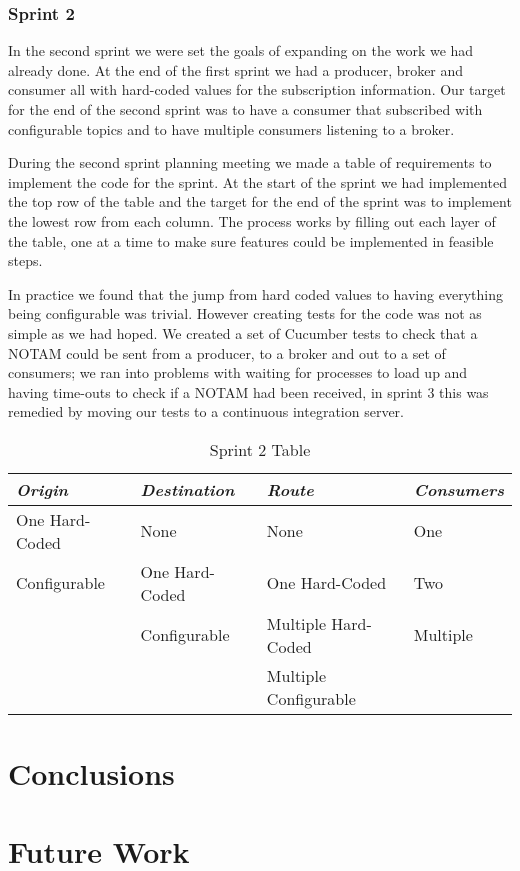 \documentclass[a4paper, 12pt]{article}
\begin{document}
\subsubsection{Sprint 2}

In the second sprint we were set the goals of expanding on the work we had already done. At the end of the first sprint we had a producer, broker and consumer all with hard-coded values for the subscription information. Our target for the end of the second sprint was to have a consumer that subscribed with configurable topics and to have multiple consumers listening to a broker.

During the second sprint planning meeting we made a table of requirements to implement the code for the sprint. At the start of the sprint we had implemented the top row of the table and the target for the end of the sprint was to implement the lowest row from each column. The process works by filling out each layer of the table, one at a time to make sure features could be implemented in feasible steps.

In practice we found that the jump from hard coded values to having everything being configurable was trivial. However creating tests for the code was not as simple as we had hoped. We created a set of Cucumber tests to check that a NOTAM could be sent from a producer, to a broker and out to a set of consumers; we ran into problems with waiting for processes to load up and having time-outs to check if a NOTAM had been received, in sprint 3 this was remedied by moving our tests to a continuous integration server. 

\begin{table}
    \begin{tabular}{|l|l|l|l|}
    \hline
    \emph{Origin}         & \emph{Destination}    & \emph{Route}                 & \emph{Consumers} \\ \hline
    One Hard-Coded & None           & None                  & One       \\ \hline
    Configurable   & One Hard-Coded & One Hard-Coded        & Two       \\ \hline
    ~              & Configurable   & Multiple Hard-Coded   & Multiple  \\ \hline
    ~              & ~              & Multiple Configurable & ~         \\ \hline
    \end{tabular}
\caption{Sprint 2 Table}
\label{tab:sprint2}
\end{table}

\section{Conclusions}
\label{sec:conclusions}

\newpage

\section{Future Work}

\newpage

\sloppy
\printbibliography
\end{document}
